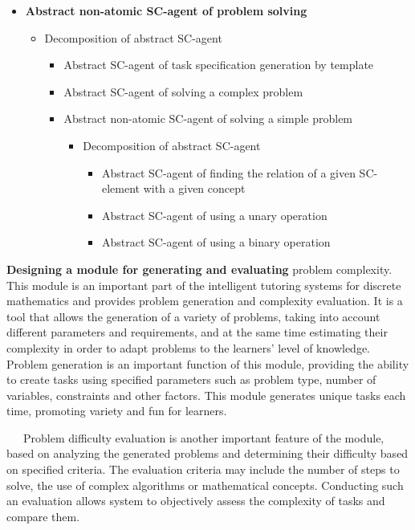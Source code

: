 \documentclass[a4paper]{article}
\begin{document}
\begin{multicols}{2}
\begin{justify}
\begin{itemize}
    \item \textbf{Abstract non-atomic SC-agent of problem solving}
    \begin{itemize}
        \item Decomposition of abstract SC-agent
        \begin{itemize}
            \item Abstract SC-agent of task specification generation by template
            \item Abstract SC-agent of solving a complex problem
            \item Abstract non-atomic SC-agent of solving a simple problem
            \begin{itemize}
                \item Decomposition of abstract SC-agent
                \begin{itemize}
                    \item Abstract SC-agent of finding the relation of a given SC-element with a given concept
                    \item Abstract SC-agent of using a unary operation
                    \item Abstract SC-agent of using a binary operation
                \end{itemize}
            \end{itemize}
        \end{itemize}
    \end{itemize}
\end{itemize}





\textbf{Designing a module for generating and evaluating}
problem complexity. This module is an important part
of the intelligent tutoring systems for discrete mathematics and provides problem generation and complexity evaluation. It is a tool that allows the generation of a variety
of problems, taking into account different parameters
and requirements, and at the same time estimating their
complexity in order to adapt problems to the learners’
level of knowledge.
\newpage
Problem generation is an important function of this
module, providing the ability to create tasks using
specified parameters such as problem type, number of
variables, constraints and other factors. This module
generates unique tasks each time, promoting variety and
fun for learners.

~~~Problem difficulty evaluation is another important feature of the module, based on analyzing the generated
problems and determining their difficulty based on specified criteria. The evaluation criteria may include the
number of steps to solve, the use of complex algorithms
or mathematical concepts. Conducting such an evaluation
allows system to objectively assess the complexity of
tasks and compare them.


\end{justify}
\end{multicols}
\end{document}
